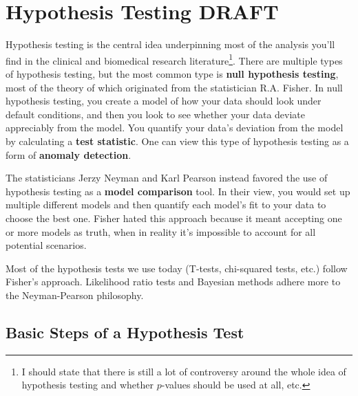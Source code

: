 \chapter{Hypothesis Testing {\color{red} DRAFT} \label{chapter:hypothesistesting}}

Hypothesis testing is the central idea underpinning most of the analysis you'll find in the clinical and biomedical research literature\footnote{I should state that there is still a lot of controversy around the whole idea of hypothesis testing and whether $p$-values should be used at all, etc.}. There are multiple types of hypothesis testing, but the most common type is \textbf{null hypothesis testing}, most of the theory of which originated from the statistician R.A. Fisher. In null hypothesis testing, you create a model of how your data should look under default conditions, and then you look to see whether your data deviate appreciably from the model. You quantify your data's deviation from the model by calculating a \textbf{test statistic}. One can view this type of hypothesis testing as a form of \textbf{anomaly detection}. 

The statisticians Jerzy Neyman and Karl Pearson instead favored the use of hypothesis testing as a \textbf{model comparison} tool. In their view, you would set up multiple different models and then quantify each model's fit to your data to choose the best one. Fisher hated this approach because it meant accepting one or more models as truth, when in reality it's impossible to account for all potential scenarios.

Most of the hypothesis tests we use today (T-tests, chi-squared tests, etc.) follow Fisher's approach. Likelihood ratio tests and Bayesian methods adhere more to the Neyman-Pearson philosophy. 


\section{Basic Steps of a Hypothesis Test}

